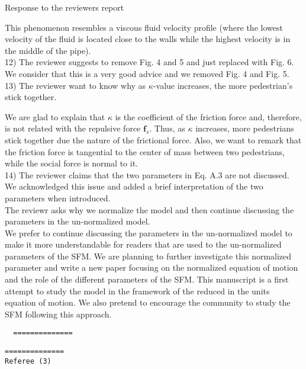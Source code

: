 \documentclass[a4paper,12pt]{letter}
\begin{document}
\begin{letter}{Response to the reviewers report}
{This phenomenon resembles a viscous fluid velocity profile (where the lowest velocity of the fluid is located close to the walls while the highest velocity is in the middle of the pipe).  \\

12) The reviewer suggests to remove Fig. 4 and 5 and just replaced with Fig. 6. We consider that this is a very good advice and we removed Fig. 4 and Fig. 5.  \\

13) The reviewer want to know why as $\kappa$-value increases, the more 
pedestrian's stick together.

We are glad to explain that $\kappa$ is the coefficient of the 
friction force and, therefore, is not related with the repulsive force 
$\mathbf{f}_s$. Thus, as $\kappa$ increases, more pedestrians stick 
together due the nature of the frictional force. Also, we want to remark that 
the friction force is tangential to the center of mass between two pedestrians, 
while the social force is normal to it. \\

14) The reviewer claims that the two parameters in Eq. A.3 are not discussed.
We acknowledged this issue and added a brief interpretation of the two parameters when introduced.\\

The reviewr asks why we normalize the model and then continue discussing the parameters in the un-normalized model.\\

We prefer to continue discussing the parameters in the un-normalized model to make it more understandable for readers that are used to the un-normalized parameters of the SFM. We are planning to further investigate this normalized parameter and write a new paper focusing on the normalized equation of motion and the role of the different parameters of the SFM. This manuscript is a first attempt to study the model in the framework of the reduced in the units equation of motion. We also pretend to encourage the community to study the SFM following this approach.


\begin{verbatim}
  ==============
\end{verbatim}

}

\newpage

\begin{verbatim}
==============
Referee (3)


\end{verbatim}
\end{letter}
\end{document}

